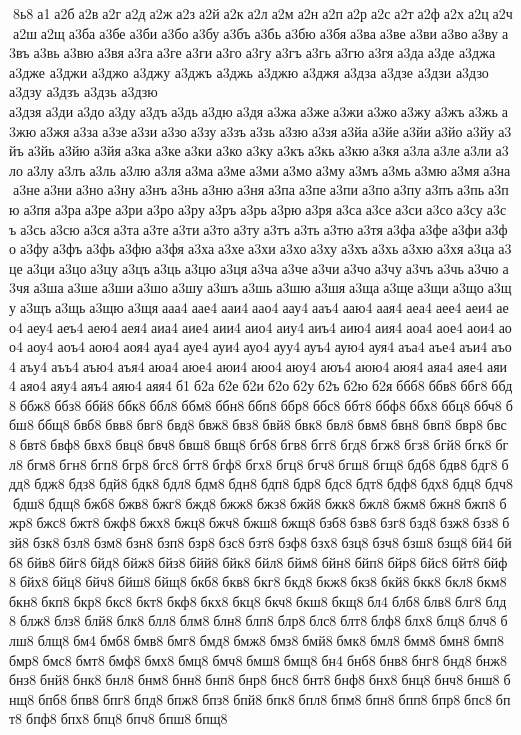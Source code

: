  8ь8 а1 а2б а2в а2г а2д а2ж а2з а2й а2к а2л а2м а2н а2п а2р а2с а2т а2ф а2х а2ц а2ч а2ш а2щ а3ба а3бе а3би а3бо а3бу а3бъ а3бь а3бю а3бя а3ва а3ве а3ви а3во а3ву а3въ а3вь а3вю а3вя а3га а3ге а3ги а3го а3гу а3гъ а3гь а3гю а3гя а3да а3де 	а3джа 	а3дже 	а3джи 	а3джо 	а3джу 	а3джъ 	а3джь 	а3джю 	а3джя 	а3дза 	а3дзе 	а3дзи 	а3дзо 	а3дзу 	а3дзъ 	а3дзь 	а3дзю 	а3дзя а3ди а3до а3ду а3дъ а3дь а3дю а3дя а3жа а3же а3жи а3жо а3жу а3жъ а3жь а3жю а3жя а3за а3зе а3зи а3зо а3зу а3зъ а3зь а3зю а3зя а3йа а3йе а3йи а3йо а3йу а3йъ а3йь а3йю а3йя а3ка а3ке а3ки а3ко а3ку а3къ а3кь а3кю а3кя а3ла а3ле а3ли а3ло а3лу а3лъ а3ль а3лю а3ля а3ма а3ме а3ми а3мо а3му а3мъ а3мь а3мю а3мя а3на а3не а3ни а3но а3ну а3нъ а3нь а3ню а3ня а3па а3пе а3пи а3по а3пу а3пъ а3пь а3пю а3пя а3ра а3ре а3ри а3ро а3ру а3ръ а3рь а3рю а3ря а3са а3се а3си а3со а3су а3съ а3сь а3сю а3ся а3та а3те а3ти а3то а3ту а3тъ а3ть а3тю а3тя а3фа а3фе а3фи а3фо а3фу а3фъ а3фь а3фю а3фя а3ха а3хе а3хи а3хо а3ху а3хъ а3хь а3хю а3хя а3ца а3це а3ци а3цо а3цу а3цъ а3ць а3цю а3ця а3ча а3че а3чи а3чо а3чу а3чъ а3чь а3чю а3чя а3ша а3ше а3ши а3шо а3шу а3шъ а3шь а3шю а3шя а3ща а3ще а3щи а3що а3щу а3щъ а3щь а3щю а3щя ааа4 аае4 ааи4 аао4 аау4 ааъ4 ааю4 аая4 аеа4 аее4 аеи4 аео4 аеу4 аеъ4 аею4 аея4 аиа4 аие4 аии4 аио4 аиу4 аиъ4 аию4 аия4 аоа4 аое4 аои4 аоо4 аоу4 аоъ4 аою4 аоя4 ауа4 ауе4 ауи4 ауо4 ауу4 ауъ4 аую4 ауя4 аъа4 аъе4 аъи4 аъо4 аъу4 аъъ4 аъю4 аъя4 аюа4 аюе4 аюи4 аюо4 аюу4 аюъ4 аюю4 аюя4 аяа4 аяе4 аяи4 аяо4 аяу4 аяъ4 аяю4 аяя4 б1 б2а б2е б2и б2о б2у б2ъ б2ю б2я ббб8 ббв8 ббг8 ббд8 ббж8 ббз8 ббй8 ббк8 ббл8 ббм8 ббн8 ббп8 ббр8 ббс8 ббт8 ббф8 ббх8 ббц8 ббч8 ббш8 ббщ8 бвб8 бвв8 бвг8 бвд8 бвж8 бвз8 бвй8 бвк8 бвл8 бвм8 бвн8 бвп8 бвр8 бвс8 бвт8 бвф8 бвх8 бвц8 бвч8 бвш8 бвщ8 бгб8 бгв8 бгг8 бгд8 бгж8 бгз8 бгй8 бгк8 бгл8 бгм8 бгн8 бгп8 бгр8 бгс8 бгт8 бгф8 бгх8 бгц8 бгч8 бгш8 бгщ8 бдб8 бдв8 бдг8 бдд8 бдж8 бдз8 бдй8 бдк8 бдл8 бдм8 бдн8 бдп8 бдр8 бдс8 бдт8 бдф8 бдх8 бдц8 бдч8 бдш8 бдщ8 бжб8 бжв8 бжг8 бжд8 бжж8 бжз8 бжй8 бжк8 бжл8 бжм8 бжн8 бжп8 бжр8 бжс8 бжт8 бжф8 бжх8 бжц8 бжч8 бжш8 бжщ8 бзб8 бзв8 бзг8 бзд8 бзж8 бзз8 бзй8 бзк8 бзл8 бзм8 бзн8 бзп8 бзр8 бзс8 бзт8 бзф8 бзх8 бзц8 бзч8 бзш8 бзщ8 бй4 бйб8 бйв8 бйг8 бйд8 бйж8 бйз8 бйй8 бйк8 бйл8 бйм8 бйн8 бйп8 бйр8 бйс8 бйт8 бйф8 бйх8 бйц8 бйч8 бйш8 бйщ8 бкб8 бкв8 бкг8 бкд8 бкж8 бкз8 бкй8 бкк8 бкл8 бкм8 бкн8 бкп8 бкр8 бкс8 бкт8 бкф8 бкх8 бкц8 бкч8 бкш8 бкщ8 бл4 блб8 блв8 блг8 блд8 блж8 блз8 блй8 блк8 блл8 блм8 блн8 блп8 блр8 блс8 блт8 блф8 блх8 блц8 блч8 блш8 блщ8 бм4 бмб8 бмв8 бмг8 бмд8 бмж8 бмз8 бмй8 бмк8 бмл8 бмм8 бмн8 бмп8 бмр8 бмс8 бмт8 бмф8 бмх8 бмц8 бмч8 бмш8 бмщ8 бн4 бнб8 бнв8 бнг8 бнд8 бнж8 бнз8 бнй8 бнк8 бнл8 бнм8 бнн8 бнп8 бнр8 бнс8 бнт8 бнф8 бнх8 бнц8 бнч8 бнш8 бнщ8 бпб8 бпв8 бпг8 бпд8 бпж8 бпз8 бпй8 бпк8 бпл8 бпм8 бпн8 бпп8 бпр8 бпс8 бпт8 бпф8 бпх8 бпц8 бпч8 бпш8 бпщ8 